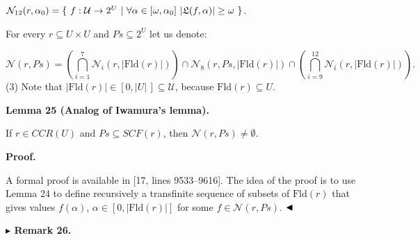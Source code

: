 \documentclass[10pt,a4paper]{amsart}
\begin{document}
$\mathcal{N}_{12}(r,\alpha_{0})=\{\leavevmode\nobreak\ f:\mathcal{U}\to 2^{U}%
\leavevmode\nobreak\ |\leavevmode\nobreak\ \forall\alpha\in[\omega,\alpha_{0}]%
\leavevmode\nobreak\ |\mathfrak{L}(f,\alpha)|\geq\omega\leavevmode\nobreak\ \}$.\par
 
 
  
 
 
For every $r\subseteq U\times U$ and $Ps\subseteq 2^{U}$ let us denote:\par
    \[\mathcal{N}(r,Ps)=\left(\bigcap_{i=1}^{7}\mathcal{N}_{i}(r,|\mathrm{Fld}(r)|)%
\right)\cap\mathcal{N}_{8}(r,Ps,|\mathrm{Fld}(r)|)\cap\left(\bigcap_{i=9}^{12}%
\mathcal{N}_{i}(r,|\mathrm{Fld}(r)|)\right).\]  (3)   
Note that $|\mathrm{Fld}(r)|\in[0,|U|\,]\subseteq\mathcal{U}$, because $\mathrm{Fld}(r)\subseteq U$.\par
 
 
 
\par\medskip\noindent\textbf{Lemma 25 (Analog of Iwamura’s lemma).}\par
 
 
If $r\in CCR(U)$ and $Ps\subseteq SCF(r)$, then $\mathcal{N}(r,Ps)\neq\emptyset$.\par
 
 
 
 
\par\medskip\noindent\textbf{Proof.}\par
 
 
A formal proof is available in [17, lines 9533–9616]. The idea of the proof is to use Lemma 24 to define recursively a transfinite sequence of subsets of $\mathrm{Fld}(r)$ that gives values $f(\alpha)$, $\alpha\in[0,|\mathrm{Fld}(r)|]$ for some $f\in\mathcal{N}(r,Ps)$. $\hfill\blacktriangleleft$\par
 
 
 
\par\medskip\noindent\textbf{$\blacktriangleright$ Remark 26.}\par
 
\end{document}
